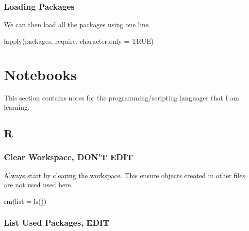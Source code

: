 \documentclass[
  letterpaper,
  DIV=11,
  numbers=noendperiod]{scrreprt}
\newenvironment{Shaded}{\begin{snugshade}}{\end{snugshade}}
\newcommand{\AttributeTok}[1]{\textcolor[rgb]{0.40,0.45,0.13}{#1}}
\newcommand{\ConstantTok}[1]{\textcolor[rgb]{0.56,0.35,0.01}{#1}}
\newcommand{\FunctionTok}[1]{\textcolor[rgb]{0.28,0.35,0.67}{#1}}
\newcommand{\NormalTok}[1]{\textcolor[rgb]{0.00,0.23,0.31}{#1}}
\begin{document}
\section{Loading Packages}\label{loading-packages}

We can then load all the packages using one line.

\begin{Shaded}
\begin{Highlighting}[]
\FunctionTok{lapply}\NormalTok{(packages, require, }\AttributeTok{character.only =} \ConstantTok{TRUE}\NormalTok{)}
\end{Highlighting}
\end{Shaded}

\part{Notebooks}

This section contains notes for the programming/scripting languages that
I am learning.

\chapter{R}\label{r}

\section*{Clear Workspace, DON'T EDIT}\label{clear-workspace-dont-edit}


Always start by clearing the workspace. This ensure objects created in
other files are not used used here.

\begin{Shaded}
\begin{Highlighting}[]
\FunctionTok{rm}\NormalTok{(}\AttributeTok{list =} \FunctionTok{ls}\NormalTok{())}
\end{Highlighting}
\end{Shaded}

\section*{List Used Packages, EDIT}\label{list-used-packages-edit}

\end{document}
